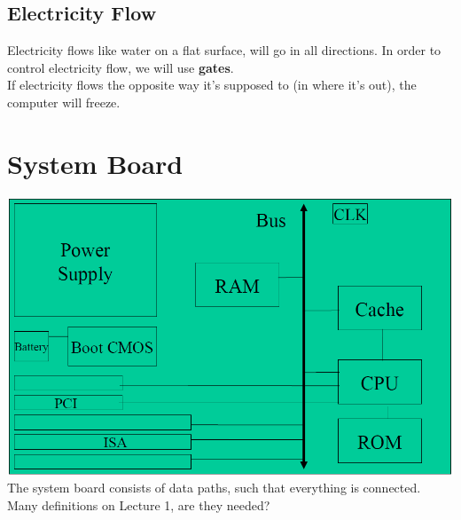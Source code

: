 \documentclass[12 pt]{article}
\begin{document}
	\subsection{Electricity Flow}
	Electricity flows like water on a flat surface, will go in all directions. In order to control electricity flow, we will use \textbf{gates}.
	\\ If electricity flows the opposite way it's supposed to (in where it's out), the computer will freeze.
	\section{System Board}
	\includegraphics[scale=0.5]{sb.png}
	The system board consists of data paths, such that everything is connected.
	\\ Many definitions on Lecture 1, are they needed?
\end{document}
